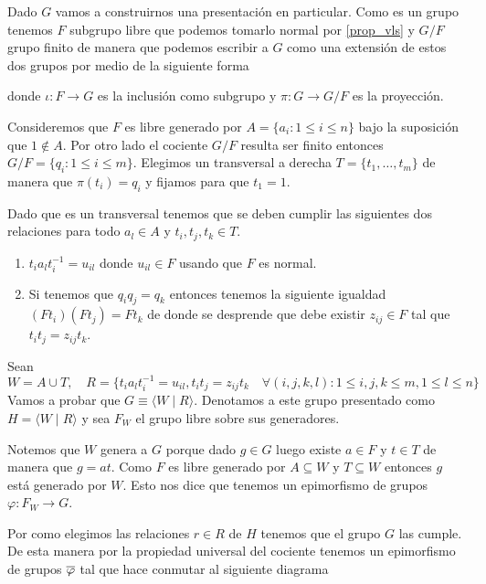 \documentclass[tesis.tex]{subfiles}
\begin{document}
\begin{obs}\label{obs_presentacion_vl}
	Dado $G$ \vl vamos a construirnos una presentación en particular.
	Como es un grupo \vl tenemos $F$ subgrupo libre que podemos tomarlo normal por \ref{prop_vls} y $G/F$ grupo finito de manera que podemos escribir a $G$ como una extensión de estos dos grupos por medio de la siguiente forma
	\begin{center}
	\end{center}
	donde $\iota: F \to G$ es la inclusión como subgrupo y $\pi: G \to G/F$ es la proyección.

	
	Consideremos que $F$ es libre generado por $A = \{ a_i : 1 \le i \le n \}$ bajo la suposición que $1 \notin A$.
	Por otro lado el cociente $G/F$ resulta ser finito entonces $G/F = \{ q_i : 1 \le i \le m \}$.
	Elegimos un transversal a derecha $T = \{ t_1, \dots, t_m \}$ de manera que $\pi(t_i)= q_i$ y fijamos para que $t_1 = 1$.
	
	Dado que es un transversal tenemos que se deben cumplir las siguientes dos relaciones para todo $a_l \in A$ y $t_i,t_j,t_k \in T$. 
	\begin{enumerate}
		\item $t_ia_{l}t_i^{-1} = u_{il}$ donde $u_{il} \in F$ usando que $F$ es normal.
		\item Si tenemos que $q_iq_j = q_k$ entonces tenemos la siguiente igualdad 
		$(Ft_{i}) (Ft_{j}) = Ft_{k}$
		de donde se desprende que debe existir $z_{ij} \in F$ tal que 
		 $t_it_j = z_{ij}t_k$.
	\end{enumerate}
	Sean
	\[
		W = A \cup T, \quad R = \{t_ia_{l}t_i^{-1} = u_{il},  t_it_j = z_{ij}t_k \quad \forall (i,j,k,l) :   1 \le i,j,k \le m, 1 \le l  \le n \}
	\]
	Vamos a probar que $G \equiv \langle W \mid R \rangle$. 
	Denotamos a este grupo presentado como $H = \langle W \mid R \rangle$ y sea $F_{W}$ el grupo libre sobre sus generadores.
	
	Notemos que $W$ genera a $G$ porque
	dado $g \in G$ luego existe $a \in F$ y $t \in T$ de manera que $g = at$.
	Como $F$ es libre generado por $A \subseteq W$ y $T \subseteq W$ entonces $g$ está generado por $W$. 
	Esto nos dice que tenemos un epimorfismo de grupos $\varphi: F_{W} \to G$.
	
	Por como elegimos las relaciones $r \in R$ de $H$ tenemos que el grupo $G$ las cumple.
	De esta manera por la propiedad universal del cociente tenemos un epimorfismo de grupos $\overline \varphi$ tal que hace conmutar al siguiente diagrama	
	\begin{center}
	\end{center}
	

\end{obs}
\end{document}
